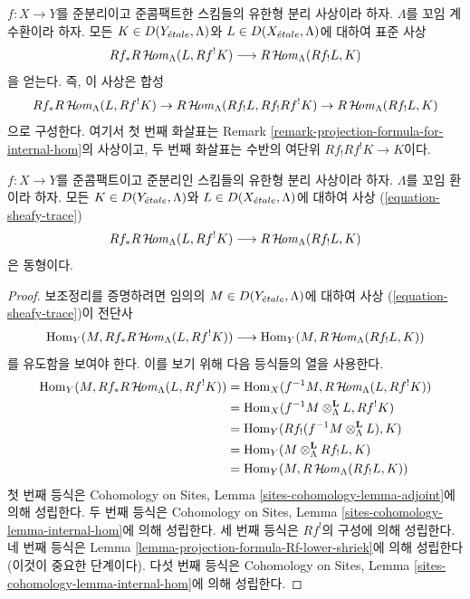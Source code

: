 \noindent
$f : X \to Y$를 준분리이고 준콤팩트한 스킴들의 유한형 분리 사상이라
하자. $\Lambda$를 꼬임 계수환이라 하자. 모든
$K \in D(Y_{\acute{e}tale}, \Lambda)$와 $L \in D(X_{\acute{e}tale}, \Lambda)$에 대하여
표준 사상
\begin{equation}
\label{equation-sheafy-trace}
Rf_*R\mathop{\mathcal{H}\!\mathit{om}}\nolimits_\Lambda(L, Rf^!K) \longrightarrow R\mathop{\mathcal{H}\!\mathit{om}}\nolimits_\Lambda(Rf_!L, K)
\end{equation}
을 얻는다. 즉, 이 사상은 합성
$$
Rf_*R\mathop{\mathcal{H}\!\mathit{om}}\nolimits_\Lambda(L, Rf^!K) \to
R\mathop{\mathcal{H}\!\mathit{om}}\nolimits_\Lambda(Rf_!L, Rf_!Rf^!K) \to
R\mathop{\mathcal{H}\!\mathit{om}}\nolimits_\Lambda(Rf_!L, K)
$$
으로 구성한다. 여기서 첫 번째 화살표는 Remark
\ref{remark-projection-formula-for-internal-hom}의 사상이고,
두 번째 화살표는 수반의 여단위 $Rf_!Rf^!K \to K$이다.

\begin{lemma}
\label{lemma-iso-on-RSheafHom}
$f : X \to Y$를 준콤팩트이고 준분리인 스킴들의 유한형 분리 사상이라
하자. $\Lambda$를 꼬임 환이라 하자. 모든
$K \in D(Y_{\acute{e}tale}, \Lambda)$와 $L \in D(X_{\acute{e}tale}, \Lambda)$에 대하여
사상 (\ref{equation-sheafy-trace})
$$
Rf_*R\mathop{\mathcal{H}\!\mathit{om}}\nolimits_\Lambda(L, Rf^!K) \longrightarrow R\mathop{\mathcal{H}\!\mathit{om}}\nolimits_\Lambda(Rf_!L, K)
$$
은 동형이다.
\end{lemma}

\begin{proof}
보조정리를 증명하려면 임의의 $M \in D(Y_{\acute{e}tale}, \Lambda)$에 대하여
사상 (\ref{equation-sheafy-trace})이 전단사
$$
\mathop{\mathrm{Hom}}\nolimits_Y(M, Rf_*R\mathop{\mathcal{H}\!\mathit{om}}\nolimits_\Lambda(L, Rf^!K))
\longrightarrow
\mathop{\mathrm{Hom}}\nolimits_Y(M, R\mathop{\mathcal{H}\!\mathit{om}}\nolimits_\Lambda(Rf_!L, K))
$$
를 유도함을 보여야 한다.
이를 보기 위해 다음 등식들의 열을 사용한다.
\begin{align*}
\mathop{\mathrm{Hom}}\nolimits_Y(M, Rf_*R\mathop{\mathcal{H}\!\mathit{om}}\nolimits_\Lambda(L, Rf^!K))
& =
\mathop{\mathrm{Hom}}\nolimits_X(f^{-1}M, R\mathop{\mathcal{H}\!\mathit{om}}\nolimits_\Lambda(L, Rf^!K)) \\
& =
\mathop{\mathrm{Hom}}\nolimits_X(f^{-1}M \otimes_\Lambda^\mathbf{L} L, Rf^!K) \\
& =
\mathop{\mathrm{Hom}}\nolimits_Y(Rf_!(f^{-1}M \otimes_\Lambda^\mathbf{L} L), K) \\
& =
\mathop{\mathrm{Hom}}\nolimits_Y(M \otimes_\Lambda^\mathbf{L} Rf_!L, K) \\
& =
\mathop{\mathrm{Hom}}\nolimits_Y(M, R\mathop{\mathcal{H}\!\mathit{om}}\nolimits_\Lambda(Rf_!L, K))
\end{align*}
첫 번째 등식은 Cohomology on Sites, Lemma
\ref{sites-cohomology-lemma-adjoint}에 의해 성립한다.
두 번째 등식은 Cohomology on Sites, Lemma
\ref{sites-cohomology-lemma-internal-hom}에 의해 성립한다.
세 번째 등식은 $Rf^!$의 구성에 의해 성립한다.
네 번째 등식은 Lemma
\ref{lemma-projection-formula-Rf-lower-shriek}에 의해 성립한다
(이것이 중요한 단계이다).
다섯 번째 등식은 Cohomology on Sites, Lemma
\ref{sites-cohomology-lemma-internal-hom}에 의해 성립한다.
\end{proof}

